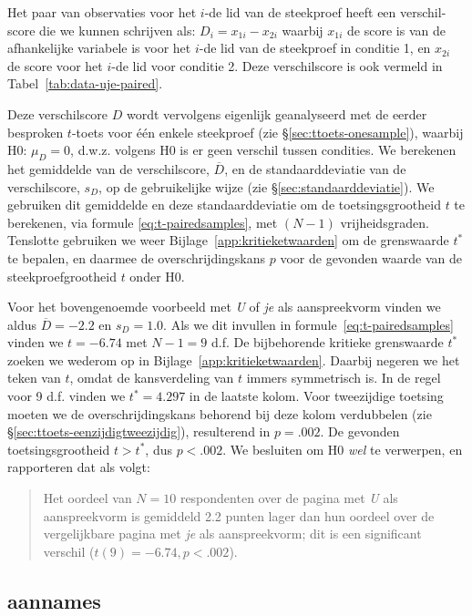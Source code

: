 \documentclass[
]{book}
\begin{document}
Het paar van observaties voor het \(i\)-de lid van de steekproef heeft een
verschil-score die we kunnen schrijven als:
\(D_i = x_{1i} - x_{2i}\) waarbij \(x_{1i}\) de score is van de afhankelijke
variabele is voor het \(i\)-de lid van de steekproef in conditie 1, en
\(x_{2i}\) de score voor het \(i\)-de lid voor conditie 2. Deze
verschilscore is ook vermeld in
Tabel~\ref{tab:data-uje-paired}.

Deze verschilscore \(D\) wordt vervolgens eigenlijk geanalyseerd met de
eerder besproken \(t\)-toets voor één enkele steekproef (zie
§\ref{sec:ttoets-onesample}), waarbij H0: \(\mu_D=0\), d.w.z. volgens H0 is er geen verschil
tussen condities. We berekenen het gemiddelde van de verschilscore,
\(\overline{D}\), en de standaarddeviatie van de verschilscore, \(s_{D}\),
op de gebruikelijke wijze (zie
§\ref{sec:standaarddeviatie}). We gebruiken dit gemiddelde en deze
standaarddeviatie om de toetsingsgrootheid \(t\) te berekenen, via formule
\eqref{eq:t-pairedsamples}, met \((N-1)\) vrijheidsgraden. Tenslotte
gebruiken we weer
Bijlage~\ref{app:kritieketwaarden} om de grenswaarde \(t^*\) te bepalen, en
daarmee de overschrijdingskans \(p\) voor de gevonden waarde van de
steekproefgrootheid \(t\) onder H0.

Voor het bovengenoemde voorbeeld met \emph{U} of \emph{je} als aanspreekvorm
vinden we aldus \(\overline{D}=-2.2\) en \(s_D=1.0\). Als we dit invullen in
formule~\eqref{eq:t-pairedsamples} vinden we \(t=-6.74\) met \(N-1=9\) d.f. De
bijbehorende kritieke grenswaarde \(t^*\) zoeken we wederom op in
Bijlage~\ref{app:kritieketwaarden}. Daarbij negeren we het teken van \(t\),
omdat de kansverdeling van \(t\) immers symmetrisch is. In de regel voor 9
d.f. vinden we \(t^*=4.297\) in de laatste kolom. Voor tweezijdige
toetsing moeten we de overschrijdingskans behorend bij deze kolom
verdubbelen (zie
§\ref{sec:ttoets-eenzijdigtweezijdig}), resulterend in \(p=.002\).
De gevonden toetsingsgrootheid \(t > t^*\), dus \(p<.002\). We besluiten om
H0 \emph{wel} te verwerpen, en rapporteren dat als volgt:

\begin{quote}
Het oordeel van \(N=10\) respondenten over de pagina met \emph{U} als
aanspreekvorm is gemiddeld 2.2 punten lager dan hun oordeel over de
vergelijkbare pagina met \emph{je} als aanspreekvorm; dit is een
significant verschil (\(t(9)=-6.74, p<.002\)).
\end{quote}

\hypertarget{aannames-1}{%
\subsection{aannames}\label{aannames-1}}
\end{document}
